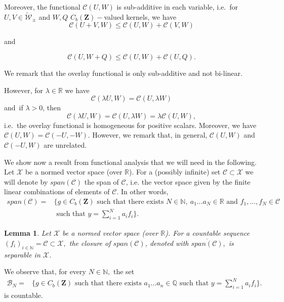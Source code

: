\documentclass[11pt]{article}
\newtheorem{lemma}[theorem]{Lemma}
\def\R{\mathbb{R}}
\def\N{\mathbb{N}}
\def\Q{\mathbb{Q}}
\newcommand{\cB}{{\mathcal B}}  %
\newcommand{\cC}{{\mathcal C}}  %
\newcommand{\cX}{{\mathcal X}}  %
\newcommand{\Space}{\mathbf{Z}}
\newcommand{\signed}{\pm}
\newcommand{\CbFunct}{C_b(\Space)}
\newcommand{\UKernel}{\widetilde{\mathcal{W}}_{\signed}}
\begin{document}
Moreover, the functional $\mathcal{C}(U, W)$ is sub-additive in each variable, i.e.\ for $U,V \in \UKernel$ and $W,Q$ $\CbFunct-$valued kernels, we have
\begin{equation}\label{subaddOverlay}
    \mathcal{C}(U+V, W) \leq \mathcal{C}(U, W)+\mathcal{C}(V, W)
\end{equation}

and 

\begin{equation}\label{subaddOverlay2}
    \mathcal{C}(U, W+Q) \leq \mathcal{C}(U, W)+\mathcal{C}(U, Q).
\end{equation}

We remark that the overlay functional is only sub-additive and not bi-linear.

However, for $\lambda\in \R$ we have $$
\mathcal{C}(\lambda U,W)=\mathcal{C}(U, \lambda W)
$$
and\ if $\lambda>0$, then
\begin{equation}\label{Poslinearityoverlay}
\mathcal{C}(\lambda U,W)=\mathcal{C}(U, \lambda W)=\lambda \mathcal{C}(U, W),   
\end{equation}
i.e.\ the overlay functional is homogeneous for positive scalars. Moreover, we have  $\mathcal{C}(U, W)=\mathcal{C}(-U,-W)$. However, we remark that, in general,  $\mathcal{C}(U, W)$ and $\mathcal{C}(-U, W)$ are unrelated.\newline

We show now a result from functional analysis that we will need in the following.\newline
Let $\cX$ be a normed vector space (over $\R$). For a (possibly infinite) set $\cC\subset \cX$ we will denote by $span(\cC)$ the span of $\cC$, i.e. the vector space given by the finite linear combinations of elements of $\cC.$ In other words, 
$$
\begin{aligned}
span(\cC)=&\{g\in  \CbFunct \text{ such that there exists }N\in\N, \ a_1\ldots a_N\in \R \text{ and }f_1,\ldots,f_N\in \cC \\
&\text{ such that } y=\sum^N_{i=1}a_if_i\}.
\end{aligned}$$

\begin{lemma}\label{lemmaSeparabSpanCount}
Let $\cX$ be a normed vector space (over $\R$).  For a countable sequence $(f_i)_{i\in \N}=\cC\subset \cX,$ the closure of $span(\cC)$, denoted with $\overline{span(\cC)},$ is separable in $\cX$. 
\end{lemma}
\proof
We observe that, for every $N\in\N,$ the set 
$$
\begin{aligned}
\cB_N=&\{g\in  \CbFunct \text{ such that there exists } a_1\ldots a_n\in \Q \text{ such that } y=\sum^N_{i=1}a_if_i\}.
\end{aligned}$$
is countable.
\end{document}
